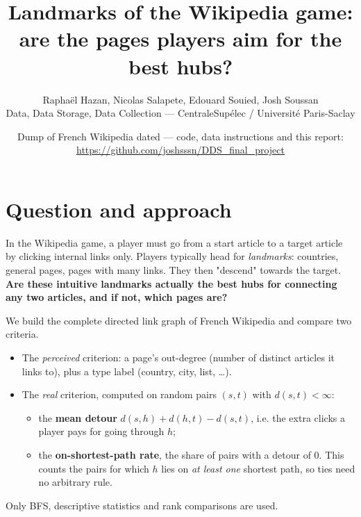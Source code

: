 \documentclass[10pt,a4paper]{article}
\title{\vspace{-1.2cm}Landmarks of the Wikipedia game:\\ are the pages players aim for the best hubs?}
\author{Raphaël Hazan, Nicolas Salapete, Edouard Souied, Josh Soussan\\
\small Data, Data Storage, Data Collection --- CentraleSupélec / Université Paris-Saclay}
\date{\small Dump of French Wikipedia dated \DumpDate{} --- code, data instructions and this report: \url{https://github.com/joshsssn/DDS_final_project}}
\begin{document}
\maketitle
\vspace{-0.6cm}

\section{Question and approach}
In the Wikipedia game, a player must go from a start article to a target article by clicking
internal links only. Players typically head for \emph{landmarks}: countries, general pages, pages
with many links. They then "descend" towards the target. \textbf{Are these intuitive
landmarks actually the best hubs for connecting any two articles, and if not, which pages are?}

We build the complete directed link graph of French Wikipedia and compare two criteria.
\begin{itemize}
\item The \emph{perceived} criterion: a page's out-degree (number of distinct articles it links to),
  plus a type label (country, city, list, \dots).
\item The \emph{real} criterion, computed on random pairs $(s,t)$ with $d(s,t)<\infty$:
  \begin{itemize}
  \item the \textbf{mean detour} $d(s,h)+d(h,t)-d(s,t)$, i.e. the extra clicks a player pays for
    going through $h$;
  \item the \textbf{on-shortest-path rate}, the share of pairs with a detour of 0. This counts
    the pairs for which $h$ lies on \emph{at least one} shortest path, so ties need no arbitrary
    rule.
  \end{itemize}
\end{itemize}
Only BFS, descriptive statistics and rank comparisons are used.
\end{document}

